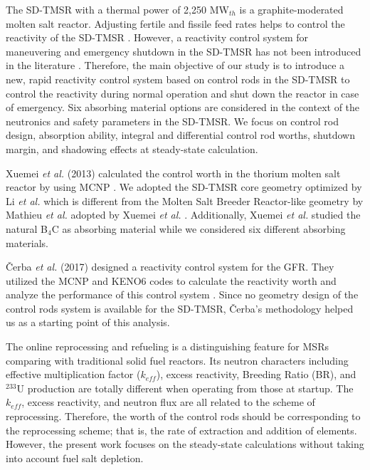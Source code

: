 The SD-TMSR with a thermal power of 2,250 MW$_{th}$ 
\cite{li_optimization_2018} is a graphite-moderated 
molten salt reactor. Adjusting fertile and fissile feed rates helps to control the reactivity of 
the SD-TMSR \cite{ashraf2020Strategies,li_optimization_2018}. However, a reactivity control system for maneuvering and emergency shutdown in the SD-TMSR has not been introduced in the literature \cite{li_optimization_2018,zou2018transition,zhang2020radiotoxicity}. Therefore, the main objective of our study is to introduce a new, 
rapid reactivity control system based on control rods in the SD-TMSR to control 
the reactivity during normal operation and shut down the reactor in case of 
emergency. Six absorbing material options are considered in the context of the 
neutronics and safety parameters in the SD-TMSR. We 
focus on control rod design, absorption ability, integral and differential 
control rod worths, shutdown margin, and shadowing 
effects at steady-state calculation.

Xuemei \emph{et al.} (2013) calculated the control worth in the thorium molten salt
reactor by using MCNP \cite{briesmeister2000mcnptm}. We adopted the SD-TMSR
core geometry optimized by Li \emph{et al.} \cite{li_optimization_2018} which
is different from the Molten Salt Breeder Reactor-like geometry by Mathieu \emph{et al.}
\cite{mathieu2006thorium} adopted by Xuemei \emph{et al.} \cite{xuemei2013study}.
Additionally, Xuemei \emph{et al.} studied the natural B$_4$C as absorbing material
while we considered six different absorbing materials.

\v{C}erba \emph{et al.} (2017) designed a reactivity control system for the 
GFR. They utilized the MCNP \cite{briesmeister2000mcnptm} and KENO6 codes 
\cite{petrie1984keno} to calculate the reactivity worth and analyze the 
performance of this control system \cite{vcerba2017optimization}. Since no
geometry design of the control rods system is available for the SD-TMSR, 
\v{C}erba's methodology \cite{vcerba2017optimization} helped us as a starting 
point of this analysis.

The online reprocessing and refueling is a distinguishing feature for MSRs comparing with traditional solid fuel reactors. Its neutron characters including effective multiplication factor ($k_{eff}$), excess reactivity, Breeding Ratio (BR), and $^{233}$U production are totally different when operating from those at startup. The $k_{eff}$, excess reactivity, and neutron flux are all related to the scheme of reprocessing. Therefore, the worth of the control rods should be corresponding to the reprocessing scheme; that is, the rate of extraction and addition of elements. However, the present work focuses on the steady-state calculations without taking into account fuel salt depletion.

